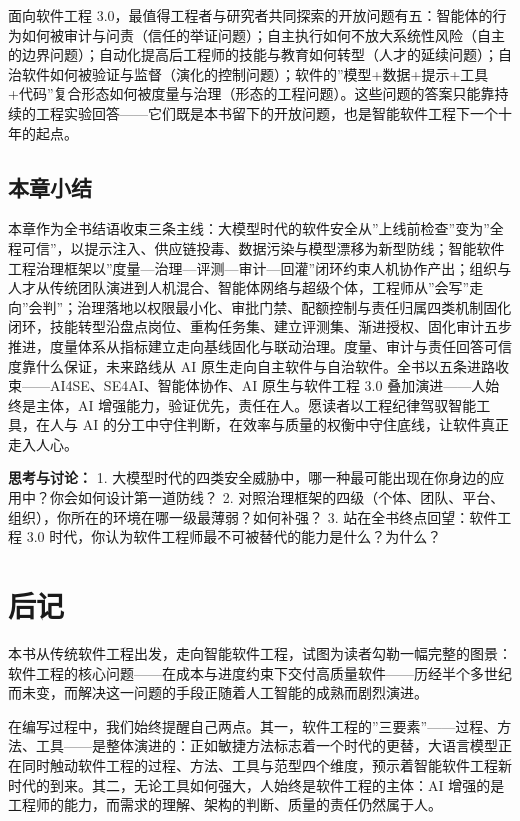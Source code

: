 \documentclass[12pt,a4paper,twoside,openany]{ctexbook}
\numberwithin{figure}{chapter}
\numberwithin{table}{chapter}
\begin{document}
面向软件工程
3.0，最值得工程者与研究者共同探索的开放问题有五：智能体的行为如何被审计与问责（信任的举证问题）；自主执行如何不放大系统性风险（自主的边界问题）；自动化提高后工程师的技能与教育如何转型（人才的延续问题）；自治软件如何被验证与监督（演化的控制问题）；软件的''模型+数据+提示+工具+代码''复合形态如何被度量与治理（形态的工程问题）。这些问题的答案只能靠持续的工程实验回答------它们既是本书留下的开放问题，也是智能软件工程下一个十年的起点。

\section{本章小结}\label{ux672cux7ae0ux5c0fux7ed3-15}

本章作为全书结语收束三条主线：大模型时代的软件安全从''上线前检查''变为''全程可信''，以提示注入、供应链投毒、数据污染与模型漂移为新型防线；智能软件工程治理框架以''度量---治理---评测---审计---回灌''闭环约束人机协作产出；组织与人才从传统团队演进到人机混合、智能体网络与超级个体，工程师从''会写''走向''会判''；治理落地以权限最小化、审批门禁、配额控制与责任归属四类机制固化闭环，技能转型沿盘点岗位、重构任务集、建立评测集、渐进授权、固化审计五步推进，度量体系从指标建立走向基线固化与联动治理。度量、审计与责任回答可信度靠什么保证，未来路线从
AI
原生走向自主软件与自治软件。全书以五条进路收束------AI4SE、SE4AI、智能体协作、AI
原生与软件工程 3.0 叠加演进------人始终是主体，AI
增强能力，验证优先，责任在人。愿读者以工程纪律驾驭智能工具，在人与 AI
的分工中守住判断，在效率与质量的权衡中守住底线，让软件真正走入人心。

\textbf{思考与讨论：} 1.
大模型时代的四类安全威胁中，哪一种最可能出现在你身边的应用中？你会如何设计第一道防线？
2.
对照治理框架的四级（个体、团队、平台、组织），你所在的环境在哪一级最薄弱？如何补强？
3. 站在全书终点回望：软件工程 3.0
时代，你认为软件工程师最不可被替代的能力是什么？为什么？

\chapter*{后记}\label{ux540eux8bb0}

本书从传统软件工程出发，走向智能软件工程，试图为读者勾勒一幅完整的图景：软件工程的核心问题------在成本与进度约束下交付高质量软件------历经半个多世纪而未变，而解决这一问题的手段正随着人工智能的成熟而剧烈演进。

在编写过程中，我们始终提醒自己两点。其一，软件工程的''三要素''------过程、方法、工具------是整体演进的：正如敏捷方法标志着一个时代的更替，大语言模型正在同时触动软件工程的过程、方法、工具与范型四个维度，预示着智能软件工程新时代的到来。其二，无论工具如何强大，人始终是软件工程的主体：AI
增强的是工程师的能力，而需求的理解、架构的判断、质量的责任仍然属于人。
\end{document}
